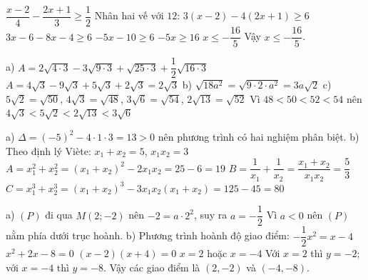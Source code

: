 \begin{problem}[9DS-BPT-004]
$\dfrac{x - 2}{4} - \dfrac{2x + 1}{3} \geq \dfrac{1}{2}$
Nhân hai vế với $12$: $3(x - 2) - 4(2x + 1) \geq 6$
$3x - 6 - 8x - 4 \geq 6$
$-5x - 10 \geq 6$
$-5x \geq 16$
$x \leq -\dfrac{16}{5}$
Vậy $x \leq -\dfrac{16}{5}$.
\end{problem}

\begin{problem}[9DS-CAN-004]
a) $A = 2\sqrt{4 \cdot 3} - 3\sqrt{9 \cdot 3} + \sqrt{25 \cdot 3} + \dfrac{1}{2}\sqrt{16 \cdot 3}$
$A = 4\sqrt{3} - 9\sqrt{3} + 5\sqrt{3} + 2\sqrt{3} = 2\sqrt{3}$
b) $\sqrt{18a^2} = \sqrt{9 \cdot 2 \cdot a^2} = 3a\sqrt{2}$
c) $5\sqrt{2} = \sqrt{50}$, $4\sqrt{3} = \sqrt{48}$, $3\sqrt{6} = \sqrt{54}$, $2\sqrt{13} = \sqrt{52}$
Vì $48 < 50 < 52 < 54$ nên $4\sqrt{3} < 5\sqrt{2} < 2\sqrt{13} < 3\sqrt{6}$
\end{problem}

\begin{problem}[9DS-PT2-005]
a) $\Delta = (-5)^2 - 4 \cdot 1 \cdot 3 = 13 > 0$ nên phương trình có hai nghiệm phân biệt.
b) Theo định lý Viète: $x_1 + x_2 = 5$, $x_1 x_2 = 3$
$A = x_1^2 + x_2^2 = (x_1 + x_2)^2 - 2x_1 x_2 = 25 - 6 = 19$
$B = \dfrac{1}{x_1} + \dfrac{1}{x_2} = \dfrac{x_1 + x_2}{x_1 x_2} = \dfrac{5}{3}$
$C = x_1^3 + x_2^3 = (x_1 + x_2)^3 - 3x_1 x_2(x_1 + x_2) = 125 - 45 = 80$
\end{problem}

\begin{problem}[9DS-HSB2-006]
a) $(P)$ đi qua $M(2; -2)$ nên $-2 = a \cdot 2^2$, suy ra $a = -\dfrac{1}{2}$
Vì $a < 0$ nên $(P)$ nằm phía dưới trục hoành.
b) Phương trình hoành độ giao điểm: $-\dfrac{1}{2}x^2 = x - 4$
$x^2 + 2x - 8 = 0$
$(x - 2)(x + 4) = 0$
$x = 2$ hoặc $x = -4$
Với $x = 2$ thì $y = -2$; với $x = -4$ thì $y = -8$.
Vậy các giao điểm là $(2, -2)$ và $(-4, -8)$.
\end{problem}
